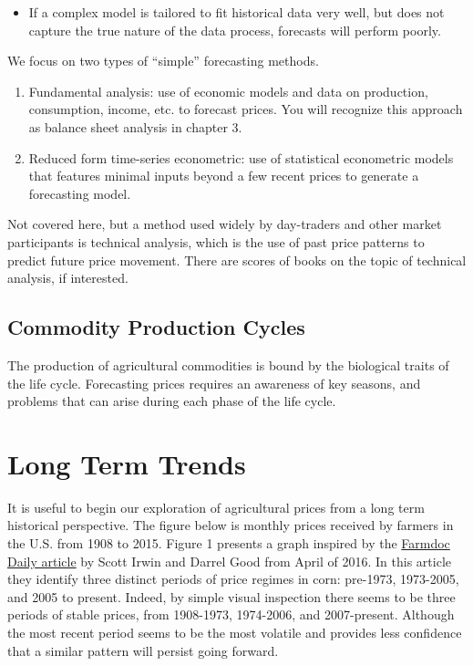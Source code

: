\documentclass[
]{book}
\providecommand{\tightlist}{%
  \setlength{\itemsep}{0pt}\setlength{\parskip}{0pt}}
\begin{document}
\begin{enumerate}
\begin{itemize}
    \begin{itemize}
    \tightlist
    \item
      If a complex model is tailored to fit historical data very well, but does not capture the true nature of the data process, forecasts will perform poorly.
    \end{itemize}
  \end{itemize}
\end{enumerate}

We focus on two types of ``simple'' forecasting methods.

\begin{enumerate}
\def\labelenumi{\arabic{enumi}.}
\item
  Fundamental analysis: use of economic models and data on production, consumption, income, etc. to forecast prices. You will recognize this approach as balance sheet analysis in chapter 3.
\item
  Reduced form time-series econometric: use of statistical econometric models that features minimal inputs beyond a few recent prices to generate a forecasting model.
\end{enumerate}

Not covered here, but a method used widely by day-traders and other market participants is technical analysis, which is the use of past price patterns to predict future price movement. There are scores of books on the topic of technical analysis, if interested.

\hypertarget{commodity-production-cycles}{%
\subsection{Commodity Production Cycles}\label{commodity-production-cycles}}

The production of agricultural commodities is bound by the biological traits of the life cycle. Forecasting prices requires an awareness of key seasons, and problems that can arise during each phase of the life cycle.

\hypertarget{long-term-trends}{%
\section{Long Term Trends}\label{long-term-trends}}

It is useful to begin our exploration of agricultural prices from a long term historical perspective. The figure below is monthly prices received by farmers in the U.S. from 1908 to 2015. Figure 1 presents a graph inspired by the \href{http://farmdocdaily.illinois.edu/2016/04/new-era-of-corn-and-soybean-prices.html}{Farmdoc Daily article} by Scott Irwin and Darrel Good from April of 2016. In this article they identify three distinct periods of price regimes in corn: pre-1973, 1973-2005, and 2005 to present. Indeed, by simple visual inspection there seems to be three periods of stable prices, from 1908-1973, 1974-2006, and 2007-present. Although the most recent period seems to be the most volatile and provides less confidence that a similar pattern will persist going forward.
\end{document}

